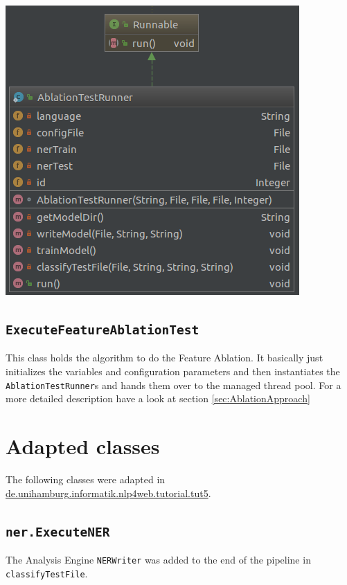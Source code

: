 \documentclass[11pt, english]{article}
\begin{document}
\includegraphics[scale=0.5]{gfx/AblationTestRunner.png}
\label{fig:AblationTestRunner}


\subsection{\texttt{ExecuteFeatureAblationTest}}
\label{sec:ExecuteFeatureAblationTest}
This class holds the algorithm to do the Feature Ablation. It basically just initializes the variables and configuration parameters and then instantiates the \verb/AblationTestRunner/s and hands them over to the managed thread pool. For a more detailed description have a look at section \ref{sec:AblationApproach}



\section{Adapted classes}
The following classes were adapted in \url{de.unihamburg.informatik.nlp4web.tutorial.tut5}.

\subsection{\texttt{ner.ExecuteNER}}
The Analysis Engine \verb/NERWriter/ was added to the end of the pipeline in \verb/classifyTestFile/.
\end{document}
